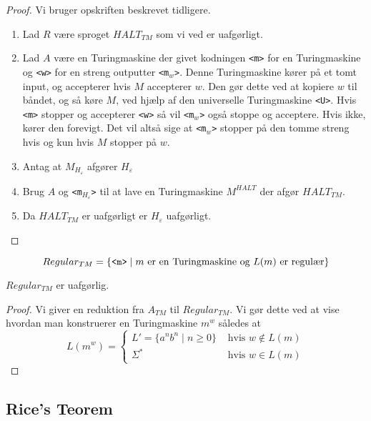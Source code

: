 \begin{proof}
  Vi bruger opskriften beskrevet tidligere.
  \begin{enumerate}
	\item Lad $R$ være sproget $HALT_{TM}$ som vi ved er uafgørligt.
	\item Lad $A$ være en Turingmaskine der givet kodningen \texttt{<m>} for en Turingmaskine og \texttt{<w>} for en streng outputter \texttt{<m$_{w}$>}. Denne Turingmaskine kører på et tomt input, og accepterer hvis $M$ accepterer $w$. Den gør dette ved at kopiere $w$ til båndet, og så køre $M$, ved hjælp af den universelle Turingmaskine \texttt{<U>}. Hvis \texttt{<m>} stopper og accepterer \texttt{<w>} så vil \texttt{<m$_{w}$>} også stoppe og acceptere. Hvis ikke, kører den forevigt. Det vil altså sige at \texttt{<m$_{w}$>} stopper på den tomme streng hvis og kun hvis $M$ stopper på $w$.
	\item Antag at $M_{H_{\varepsilon}}$ afgører $H_{\varepsilon}$
	\item Brug $A$ og \texttt{<m$_{H_{\varepsilon}}$>} til at lave en Turingmaskine $M^{HALT}$ der afgør $HALT_{TM}$.
	\item Da $HALT_{TM}$ er uafgørligt er $H_{\varepsilon}$ uafgørligt.
  \end{enumerate}

\end{proof}

\begin{equation*}
	Regular_{TM} = \{\text{\texttt{<m>}} \mid m \text{ er en Turingmaskine og }L(m) \text{ er regulær}\}
\end{equation*}

\begin{theorem}
	$Regular_{TM}$ er uafgørlig.
\end{theorem}

\begin{proof}
  Vi giver en reduktion fra $A_{TM}$ til $Regular_{TM}$. Vi gør dette ved at vise hvordan man konstruerer en Turingmaskine $m^{w}$ således at
  \begin{equation*}
L(m^{w}) = \begin{cases}
L' = \{a^{n}b^{n} \mid n \ge 0\} & \text{ hvis } w \notin L(m)\\
\Sigma^{*} & \text{ hvis } w \in L(m)
\end{cases}
  \end{equation*}
\end{proof}

\subsection{Rice's Teorem}%
\label{subsec:ricetheorem}

